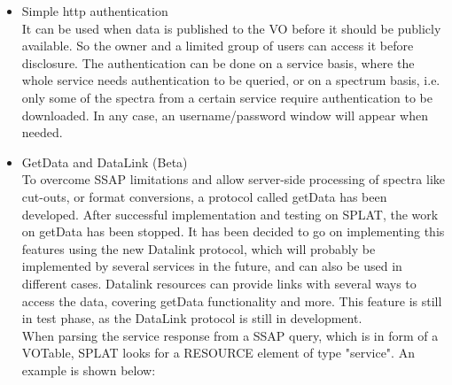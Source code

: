 \documentclass[final,authoryear,5p,times,twocolumn]{elsarticle}
\begin{document}
\begin{itemize}
\item Simple http authentication\\
It can be used when data is published to the VO before it should be publicly available. So the owner and a limited group of users can access it before disclosure. The authentication can be done on a service basis, where the whole service needs authentication to be queried, or on a spectrum basis, i.e. only some of the spectra from a certain service require authentication to be downloaded. In any case,  an username/password window will appear when needed.

\item GetData and DataLink (Beta)\\
To overcome SSAP limitations and allow server-side processing of spectra like cut-outs, or format conversions, a protocol called getData has been developed. After successful implementation and testing on SPLAT, the work on getData has been stopped. It has been decided to go on implementing this features using the new Datalink protocol, which will probably be implemented by several services in the future, and can also be used in different cases.  Datalink resources can provide links with several ways to access the data, covering getData functionality and more. This feature is still in test phase, as the DataLink protocol is still in development.\\

When parsing the service response from a SSAP query, which is in form of a VOTable, SPLAT looks for a RESOURCE element of type "service".
An example is shown below:\\\\




\end{itemize}
\end{document}
